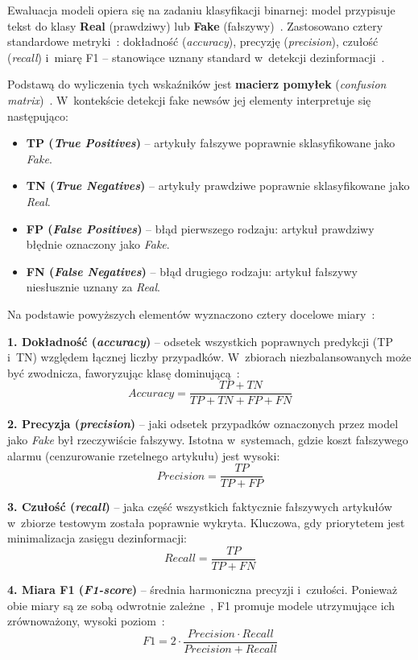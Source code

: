\documentclass[oneside,polski,logo]{amuthesis}
\begin{document}
Ewaluacja modeli opiera się na zadaniu klasyfikacji binarnej: model przypisuje tekst do klasy \textbf{Real} (prawdziwy) lub \textbf{Fake} (fałszywy)~\cite{zhou2020survey, Shu2017}. Zastosowano cztery standardowe metryki~\cite{tharwat2020classification}: dokładność (\textit{accuracy}), precyzję (\textit{precision}), czułość (\textit{recall}) i~miarę F1 -- stanowiące uznany standard w~detekcji dezinformacji~\cite{zhou2020survey, Hu2025}.

Podstawą do wyliczenia tych wskaźników jest \textbf{macierz pomyłek} (\textit{confusion matrix})~\cite{tharwat2020classification}. W~kontekście detekcji fake newsów jej elementy interpretuje się następująco:
\begin{itemize}
    \item \textbf{TP (\textit{True Positives})} -- artykuły fałszywe poprawnie sklasyfikowane jako \textit{Fake}.
    \item \textbf{TN (\textit{True Negatives})} -- artykuły prawdziwe poprawnie sklasyfikowane jako \textit{Real}.
    \item \textbf{FP (\textit{False Positives})} -- błąd pierwszego rodzaju: artykuł prawdziwy błędnie oznaczony jako \textit{Fake}.
    \item \textbf{FN (\textit{False Negatives})} -- błąd drugiego rodzaju: artykuł fałszywy niesłusznie uznany za \textit{Real}.
\end{itemize}

Na podstawie powyższych elementów wyznaczono cztery docelowe miary~\cite{tharwat2020classification}:

\textbf{1. Dokładność (\textit{accuracy})} -- odsetek wszystkich poprawnych predykcji (TP i~TN) względem łącznej liczby przypadków. W~zbiorach niezbalansowanych może być zwodnicza, faworyzując klasę dominującą~\cite{powers2011evaluation}:
\[ Accuracy = \frac{TP + TN}{TP + TN + FP + FN} \]

\textbf{2. Precyzja (\textit{precision})} -- jaki odsetek przypadków oznaczonych przez model jako \textit{Fake} był rzeczywiście fałszywy. Istotna w~systemach, gdzie koszt fałszywego alarmu (cenzurowanie rzetelnego artykułu) jest wysoki:
\[ Precision = \frac{TP}{TP + FP} \]

\textbf{3. Czułość (\textit{recall})} -- jaka część wszystkich faktycznie fałszywych artykułów w~zbiorze testowym została poprawnie wykryta. Kluczowa, gdy priorytetem jest minimalizacja zasięgu dezinformacji:
\[ Recall = \frac{TP}{TP + FN} \]

\textbf{4. Miara F1 (\textit{F1-score})} -- średnia harmoniczna precyzji i~czułości. Ponieważ obie miary są ze sobą odwrotnie zależne~\cite{powers2011evaluation}, F1 promuje modele utrzymujące ich zrównoważony, wysoki poziom~\cite{tharwat2020classification}:
\[ F1 = 2 \cdot \frac{Precision \cdot Recall}{Precision + Recall} \]
\end{document}

